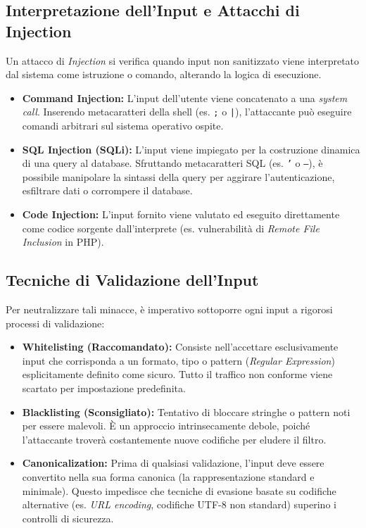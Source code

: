 \subsection{Interpretazione dell'Input e Attacchi di Injection}
Un attacco di \textit{Injection} si verifica quando input non sanitizzato viene interpretato dal sistema come istruzione o comando, alterando la logica di esecuzione.
\begin{itemize}
    \item \textbf{Command Injection:} L'input dell'utente viene concatenato a una \textit{system call}. Inserendo metacaratteri della shell (es. \texttt{;} o \texttt{|}), l'attaccante può eseguire comandi arbitrari sul sistema operativo ospite.
    \item \textbf{SQL Injection (SQLi):} L'input viene impiegato per la costruzione dinamica di una query al database. Sfruttando metacaratteri SQL (es. \texttt{'} o \texttt{--}), è possibile manipolare la sintassi della query per aggirare l'autenticazione, esfiltrare dati o corrompere il database.
    
    
    
    \item \textbf{Code Injection:} L'input fornito viene valutato ed eseguito direttamente come codice sorgente dall'interprete (es. vulnerabilità di \textit{Remote File Inclusion} in PHP).
\end{itemize}

\subsection{Tecniche di Validazione dell'Input}
Per neutralizzare tali minacce, è imperativo sottoporre ogni input a rigorosi processi di validazione:
\begin{itemize}
    \item \textbf{Whitelisting (Raccomandato):} Consiste nell'accettare esclusivamente input che corrisponda a un formato, tipo o pattern (\textit{Regular Expression}) esplicitamente definito come sicuro. Tutto il traffico non conforme viene scartato per impostazione predefinita.
    \item \textbf{Blacklisting (Sconsigliato):} Tentativo di bloccare stringhe o pattern noti per essere malevoli. È un approccio intrinsecamente debole, poiché l'attaccante troverà costantemente nuove codifiche per eludere il filtro.
    \item \textbf{Canonicalization:} Prima di qualsiasi validazione, l'input deve essere convertito nella sua forma canonica (la rappresentazione standard e minimale). Questo impedisce che tecniche di evasione basate su codifiche alternative (es. \textit{URL encoding}, codifiche UTF-8 non standard) superino i controlli di sicurezza.
\end{itemize}

